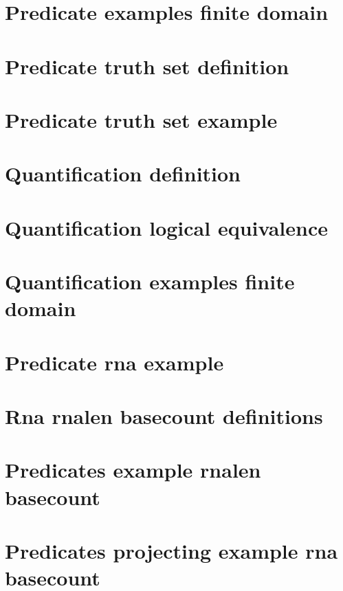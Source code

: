 \section*{Predicate examples finite domain}

\vfill
\section*{Predicate truth set definition}

\vfill
\section*{Predicate truth set example}

\vfill
\section*{Quantification definition}

\vfill
\section*{Quantification logical equivalence}

\vfill
\section*{Quantification examples finite domain}

\vfill
\section*{Predicate rna example}

\vfill
\section*{Rna rnalen basecount definitions}

\vfill
\section*{Predicates example rnalen basecount}

\vfill
\section*{Predicates projecting example rna basecount}

\vfill
